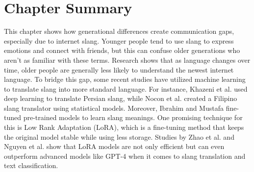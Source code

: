 \section{Chapter Summary}
This chapter shows how generational differences create communication gaps, especially due to internet slang.
Younger people tend to use slang to express emotions and connect with friends, but this can confuse older generations who aren't as familiar with these terms.
Research shows that as language changes over time, older people are generally less likely to understand the newest internet language.
To bridge this gap, some recent studies have utilized machine learning to translate slang into more standard language.
For instance, Khazeni et al. \cite{Khazeni} used deep learning to translate Persian slang, while Nocon et al. \cite{Nocon_Kho_Arroyo_2018} created a Filipino slang translator using statistical models.
Moreover, Ibrahim and Mustafa \cite{Ibrahim_Sharief} fine-tuned pre-trained models to learn slang meanings.
One promising technique for this is Low Rank Adaptation (LoRA), which is a fine-tuning method that keeps the original model stable while using less storage.
Studies by Zhao et al. \cite{zhao2024loraland310finetuned} and Nguyen et al. \cite{nguyen2023finetuningllama2large} show that LoRA models are not only efficient but can even outperform advanced models like GPT-4 when it comes to slang translation and text classification. 
